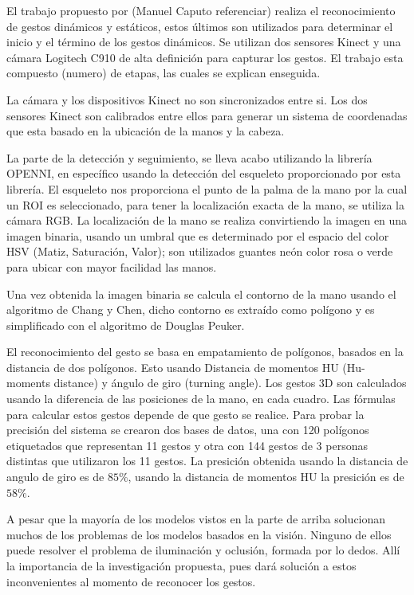 El trabajo propuesto por (Manuel Caputo referenciar) realiza el reconocimiento de gestos dinámicos y estáticos, estos últimos son utilizados para determinar el inicio y el término de los gestos dinámicos.  Se utilizan  dos sensores Kinect y una cámara Logitech C910 de alta definición para capturar los gestos. El trabajo esta compuesto (numero) de etapas, las cuales se explican enseguida. 

La cámara y los dispositivos Kinect no son sincronizados entre si. Los dos sensores Kinect son calibrados entre ellos para generar un sistema de coordenadas que esta basado en la ubicación de la  manos y la cabeza. 

La parte de la detección y seguimiento, se lleva acabo utilizando la librería OPENNI, en específico usando la detección del esqueleto proporcionado por esta librería. El esqueleto nos proporciona el punto de la palma de la mano por la cual un ROI es seleccionado, para tener la localización exacta de la mano, se utiliza la cámara RGB. La localización de la mano se realiza convirtiendo la imagen en una imagen binaria, usando un umbral que es determinado por el espacio del color HSV (Matiz, Saturación, Valor); son utilizados guantes neón color rosa o verde para ubicar con mayor facilidad las manos.   

Una vez obtenida la imagen binaria se calcula el contorno de la mano usando el algoritmo de Chang y Chen, dicho contorno es extraído como polígono y  es simplificado con el algoritmo de Douglas Peuker. 

El reconocimiento del gesto se basa en empatamiento de polígonos, basados en la distancia de dos polígonos. Esto usando Distancia de momentos HU (Hu-moments distance) y ángulo de giro (turning angle). 
Los gestos 3D son calculados usando la diferencia de las posiciones de la mano, en cada cuadro. Las fórmulas para calcular estos gestos depende de que gesto se  realice.  
Para probar la precisión del sistema se crearon dos bases de datos, una con 120 polígonos etiquetados que representan 11 gestos y otra con 144 gestos de 3 personas distintas que utilizaron los 11 gestos. La presición obtenida usando la distancia de angulo de giro es de $85 \%$, usando la distancia de momentos HU la presición es de $58 \%$. 

A pesar que la mayoría de los modelos vistos en la parte de arriba solucionan muchos de los problemas de los modelos basados en la visi\'on. Ninguno de ellos puede resolver el problema de iluminaci\'on y oclusi\'on, formada por lo dedos. All\'i la importancia de la investigaci\'on propuesta, pues dar\'a soluci\'on a estos inconvenientes al momento de reconocer los gestos.
 
